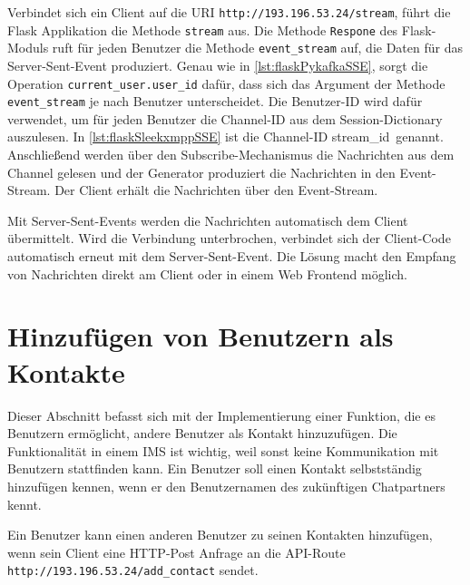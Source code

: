 \documentclass[a4paper,titlepage,halfparskip,12pt]{scrreprt}
\begin{document}
\begin{onehalfspacing}
Verbindet sich ein Client auf die \acs{URI} \texttt{http://193.196.53.24/stream}, führt die Flask Applikation die Methode \texttt{stream} aus. Die Methode \texttt{Respone} des Flask-Moduls ruft für jeden Benutzer die Methode \texttt{event\_stream} auf, die Daten für das Server-Sent-Event produziert. Genau wie in \autoref{lst:flaskPykafkaSSE}, sorgt die Operation \texttt{current\_user.user\_id} dafür, dass sich das Argument der Methode \texttt{event\_stream} je nach Benutzer unterscheidet. Die Benutzer-ID wird dafür verwendet, um für jeden Benutzer die Channel-ID aus dem Session-Dictionary auszulesen. In \autoref{lst:flaskSleekxmppSSE} ist die Channel-ID \glqq stream\_id\grqq\ genannt. Anschließend werden über den Subscribe-Mechanismus die Nachrichten aus dem Channel gelesen und der Generator produziert die Nachrichten in den Event-Stream. Der Client erhält die Nachrichten über den Event-Stream.

Mit Server-Sent-Events werden die Nachrichten automatisch dem Client übermittelt. Wird die Verbindung unterbrochen, verbindet sich der Client-Code automatisch erneut mit dem Server-Sent-Event. Die Lösung macht den Empfang von Nachrichten direkt am Client oder in einem Web Frontend möglich.

\section{Hinzufügen von Benutzern als Kontakte}

Dieser Abschnitt befasst sich mit der Implementierung einer Funktion, die es Benutzern ermöglicht, andere Benutzer als Kontakt hinzuzufügen. Die Funktionalität in einem \acs{IMS} ist wichtig, weil sonst keine Kommunikation mit Benutzern stattfinden kann. Ein Benutzer soll einen Kontakt selbstständig hinzufügen kennen, wenn er den Benutzernamen des zukünftigen Chatpartners kennt.

Ein Benutzer kann einen anderen Benutzer zu seinen Kontakten hinzufügen, wenn sein Client eine \acs{HTTP}-Post Anfrage an die \acs{API}-Route \texttt{http://193.196.53.24/add\_contact} sendet.


\end{onehalfspacing}
\end{document}
